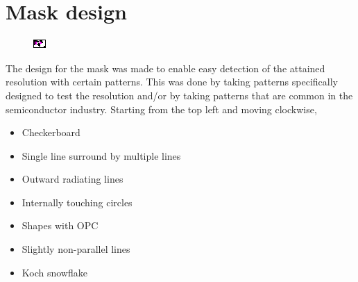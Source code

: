 \section{Mask design}
\begin{figure}[H]
    \centering
    \includegraphics[trim=0mm 0.12mm 0.17mm 0mm, clip=true,width=\linewidth]{figures/litho_design.pdf}
    \label{fig:litho_design}
\end{figure}

The design for the mask was made to enable easy detection of the attained resolution with certain patterns. This was done by taking patterns specifically designed to test the resolution and/or by taking patterns that are common in the semiconductor industry. Starting from the top left and moving clockwise,

\begin{itemize}
    \item Checkerboard
    \item Single line surround by multiple lines
    \item Outward radiating lines
    \item Internally touching circles
    \item Shapes with OPC
    \item Slightly non-parallel lines
    \item Koch snowflake
\end{itemize}

